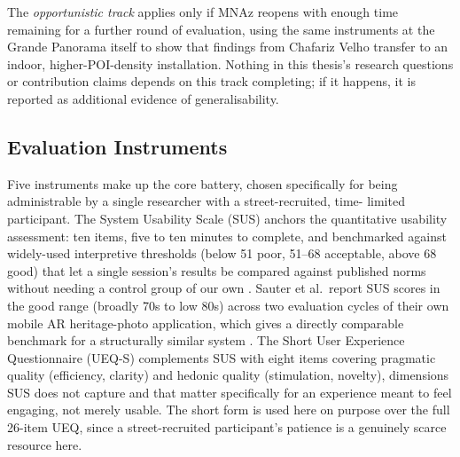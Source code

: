 \begin{aitemize}[nosep]
The \emph{opportunistic track} applies only if MNAz reopens with enough
time remaining for a further round of evaluation, using the same
instruments at the Grande Panorama itself to show that findings from
Chafariz Velho transfer to an indoor, higher-POI-density installation.
Nothing in this thesis's research questions or contribution claims
depends on this track completing; if it happens, it is reported as
additional evidence of generalisability.
 
\subsection{Evaluation Instruments}
\label{subsec:pw-eval-instruments}
 
Five instruments make up the core battery, chosen specifically for being
administrable by a single researcher with a street-recruited, time-
limited participant. The System Usability Scale (SUS) anchors the
quantitative usability assessment: ten items, five to ten minutes to
complete, and benchmarked against widely-used interpretive thresholds
(below 51 poor, 51--68 acceptable, above 68 good) that let a single
session's results be compared against published norms without needing a
control group of our own \cite{brooke1996,bangor2008}. Sauter et al.\
report SUS scores in the good range (broadly 70s to low 80s) across two
evaluation cycles of their own mobile AR heritage-photo application,
which gives a directly comparable benchmark for a structurally similar
system \cite{sauter2024}. The Short User Experience Questionnaire
(UEQ-S) complements SUS with eight items covering pragmatic quality
(efficiency, clarity) and hedonic quality (stimulation, novelty),
dimensions SUS does not capture and that matter specifically for an
experience meant to feel engaging, not merely usable. The
short form is used here on purpose over the full 26-item UEQ, since a
street-recruited participant's patience is a genuinely scarce resource here.
 

\end{aitemize}
